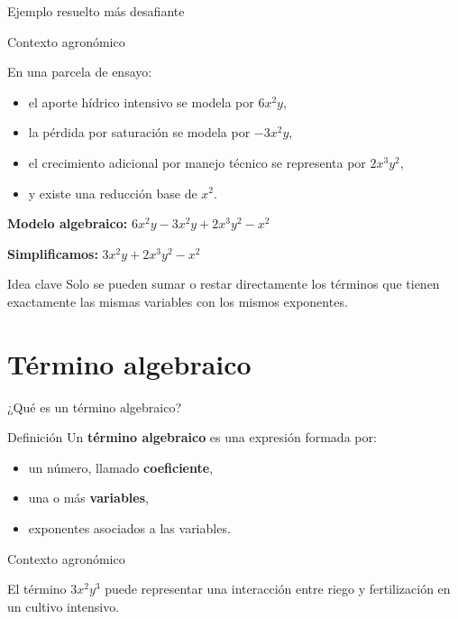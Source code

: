 \documentclass[handout,aspectratio=169,12pt]{beamer}
\newcommand{\IdeaClave}[1]{
	\begin{alertblock}{Idea clave}
		#1
	\end{alertblock}
}
\newcommand{\Agronomia}[1]{
	\begin{exampleblock}{Contexto agronómico}
		#1
	\end{exampleblock}
}
\begin{document}
	\begin{frame}{Ejemplo resuelto más desafiante}
		\Agronomia{
			En una parcela de ensayo:
			\begin{itemize}
				\item el aporte hídrico intensivo se modela por \(6x^2y\),
				\pause
				\item la pérdida por saturación se modela por \(-3x^2y\),
				\pause
				\item el crecimiento adicional por manejo técnico se representa por \(2x^3y^2\),
				\pause
				\item y existe una reducción base de \(x^2\).
			\end{itemize}
		}
		
		\pause
		\textbf{Modelo algebraico:} \qquad $6x^2y - 3x^2y + 2x^3y^2 - x^2$
		
		\pause
		\medskip \textbf{Simplificamos:} \qquad $3x^2y + 2x^3y^2 - x^2$
		
		\pause
		\IdeaClave{Solo se pueden sumar o restar directamente los términos que tienen exactamente las mismas variables con los mismos exponentes.}
	\end{frame}
	
	\section{Término algebraico}
	\begin{frame}{¿Qué es un término algebraico?}
		\begin{block}{Definición}
			Un \textbf{término algebraico} es una expresión formada por:
			\begin{itemize}
				\item un número, llamado \textbf{coeficiente},
				\pause
				\item una o más \textbf{variables},
				\pause
				\item exponentes asociados a las variables.
			\end{itemize}
		\end{block}
		
		\pause
		\Agronomia{
			El término \(3x^2y^3\) puede representar una interacción entre riego y fertilización en un cultivo intensivo.
		}
	\end{frame}
	
\end{document}
